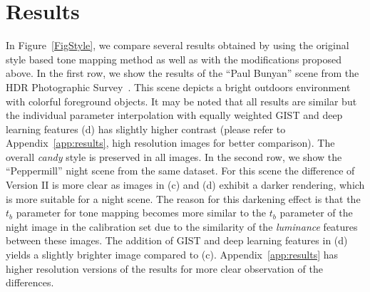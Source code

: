 \section{Results}
In Figure~\ref{FigStyle}, 
we compare several results obtained by using the original style based tone mapping method as well as with the modifications proposed above. In the first row, we show the results of
the ``Paul Bunyan'' scene from the HDR Photographic Survey~\cite{fairchild2007hdr}. This scene depicts a bright outdoors environment with colorful foreground objects. It may be noted that all results are similar but the individual parameter interpolation with equally weighted GIST and deep learning features (d) has slightly higher contrast (please refer to Appendix~\ref{app:results}, high resolution images for better comparison). 
The overall \emph{candy} style is preserved in all images. In the second row, we show the ``Peppermill'' night scene from the same dataset. For this scene the difference of Version II is more clear as images in (c) and (d) exhibit a darker rendering, which is more suitable for a night scene. The reason for this darkening effect is that the $t_b$ parameter for tone mapping becomes more similar to the $t_b$ parameter of the night image in the calibration set due to the similarity of the \emph{luminance} features between these images. The addition of GIST and deep learning features in (d) yields a slightly brighter image compared to (c). Appendix~\ref{app:results} has higher resolution versions of the results for more clear observation of the differences.


